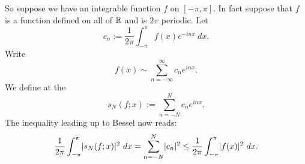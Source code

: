So suppose we have an integrable function $f$ on $[-\pi,\pi]$.  In fact
suppose
that $f$ is a function defined on all of ${\mathbb{R}}$ and is $2\pi$ periodic.
Let
\begin{equation*}
c_n := 
\frac{1}{2\pi} \int_{-\pi}^\pi
f(x) e^{-inx} ~ dx .
\end{equation*}
Write
\begin{equation*}
f(x) \sim
\sum_{n=-\infty}^\infty c_n e^{inx} .
\end{equation*}
We define at the \emph{}
\begin{equation*}
s_N(f;x) := 
\sum_{n=-N}^N c_n e^{inx} .
\end{equation*}
The inequality leading up to Bessel now reads:
\begin{equation*}
\frac{1}{2\pi} \int_{-\pi}^\pi
\lvert {s_N(f;x)} \rvert^2 ~ dx =
\sum_{n=-N}^N \lvert {c_n} \rvert^2
\leq
\frac{1}{2\pi} \int_{-\pi}^\pi
\lvert {f(x)} \rvert^2
~ dx .
\end{equation*}

